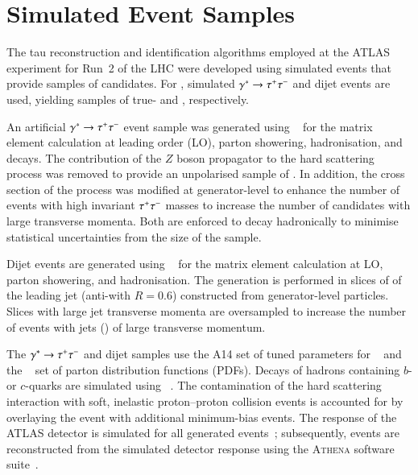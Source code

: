\section{Simulated Event Samples}%
\label{sec:tauid_mc}

The tau reconstruction and identification algorithms employed at the ATLAS
experiment for Run~2 of the LHC were developed using simulated events that
provide samples of \tauhadvis candidates. For \tauid, simulated
$\gamma^{*} \to \tau^{+} \tau^{-}$ and dijet events are used, yielding samples of true-
and \faketauhadvis, respectively.

An artificial $\gamma^{*} \to \tau^{+} \tau^{-}$ event sample was generated
using \PYTHIA[8.212]~\cite{Sjostrand:2014zea} for the matrix element
calculation at leading order (LO), parton showering, hadronisation,
and \taulepton decays. The contribution of the $Z$ boson propagator to
the hard scattering process was removed to provide an unpolarised
sample of \tauleptons. In addition, the cross section of the process
was modified at generator-level to enhance the number of events with
high invariant $\tau^{+} \tau^{-}$ masses to increase the number of \tauhadvis
candidates with large transverse momenta. Both \tauleptons
are enforced to decay hadronically to minimise statistical
uncertainties from the size of the \truetauhadvis sample.

Dijet events are generated using \PYTHIA[8.186]~\cite{Sjostrand:2014zea} for the
matrix element calculation at LO, parton showering, and hadronisation. The
generation is performed in slices of \pT of the leading jet (anti-\kt with
$R = 0.6$) constructed from generator-level particles. Slices with large jet
transverse momenta are oversampled to increase the number of events with jets
(\faketauhadvis) of large transverse momentum.

The $\gamma^{*} \to \tau^{+} \tau^{-}$ and dijet samples use the A14 set of tuned
parameters for \PYTHIA[8]~\cite{ATL-PHYS-PUB-2014-021} and the
\NNPDF[2.3lo]~\cite{Ball:2012cx} set of parton distribution functions (PDFs).
Decays of hadrons containing $b$- or $c$-quarks are simulated using
\EVTGEN[v1.2.0]~\cite{Lange:2001uf}. The contamination of the hard scattering
interaction with soft, inelastic proton--proton collision events is accounted
for by overlaying the event with additional minimum-bias events. The response of
the ATLAS detector is simulated for all generated events~\cite{SOFT-2010-01};
subsequently, events are reconstructed from the simulated detector response
using the \textsc{Athena} software suite~\cite{ATL-SOFT-PUB-2021-001}.


